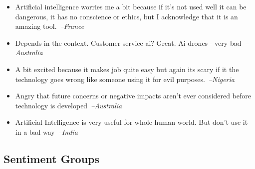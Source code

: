 \documentclass[sigconf]{acmart}
\newcommand\aff[1]{\textcolor{darkplum}{{\emph{--#1}}}}
\newenvironment{lq2}
{ \begin{itemize}[leftmargin = 2.0em, rightmargin=1.0em, label={}]
    \fontsize{8.3pt}{8.9pt}\selectfont
\setlength{\itemsep}{3pt}
    \setlength{\parskip}{3pt}
    \setlength{\parsep}{3pt}     }
{ \end{itemize}                  }
\begin{document}
\begin{lq2}
\item Artificial intelligence worries me a bit because if it's not used well it can be dangerous, it has no conscience or ethics, but I acknowledge that it is an amazing tool.~\aff{France}
\item Depends in the context. Customer service ai? Great. Ai drones - very bad~\aff{Australia}
\item A bit excited because it makes job quite easy but again its scary if it the technology goes wrong like someone using it for evil purposes.~\aff{Nigeria}
\item Angry that future concerns or negative impacts aren't ever considered before technology is developed~\aff{Australia}
\item Artificial Intelligence is very useful for whole human world. But don't use it in a bad way~\aff{India}
\end{lq2}












%
     
    \subsection{Sentiment Groups}
\end{document}
